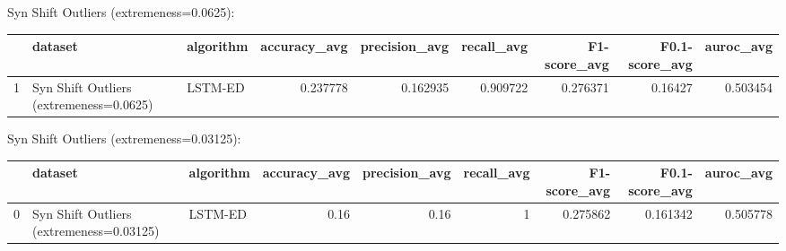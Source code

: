 Syn Shift Outliers (extremeness=0.0625):

\begin{tabular}{rllrrrrrr}
\hline
    & dataset                                 & algorithm   &   accuracy\_avg &   precision\_avg &   recall\_avg &   F1-score\_avg &   F0.1-score\_avg &   auroc\_avg \\
\hline
  1 & Syn Shift Outliers (extremeness=0.0625) & LSTM-ED     &       0.237778 &        0.162935 &     0.909722 &       0.276371 &          0.16427 &    0.503454 \\
\hline
\end{tabular}

Syn Shift Outliers (extremeness=0.03125):

\begin{tabular}{rllrrrrrr}
\hline
    & dataset                                  & algorithm   &   accuracy\_avg &   precision\_avg &   recall\_avg &   F1-score\_avg &   F0.1-score\_avg &   auroc\_avg \\
\hline
  0 & Syn Shift Outliers (extremeness=0.03125) & LSTM-ED     &           0.16 &            0.16 &            1 &       0.275862 &         0.161342 &    0.505778 \\
\hline
\end{tabular}

